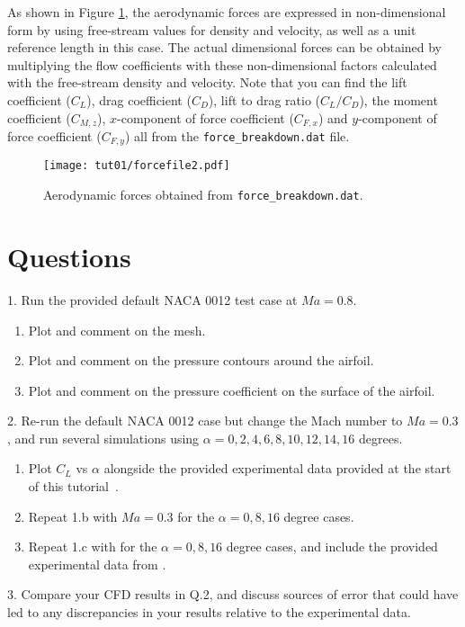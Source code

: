 As shown in Figure \ref{fig1:forcefile2}, the aerodynamic forces are expressed in non-dimensional form by using free-stream values for density and velocity, as well as a unit reference length in this case. The actual dimensional forces can be obtained by multiplying the flow coefficients with these non-dimensional factors calculated with the free-stream density and velocity. Note that you can find the lift coefficient ($C_L$), drag coefficient ($C_D$), lift to drag ratio ($C_L / C_D$), the moment coefficient ($C_{M,z}$), $x$-component of force coefficient ($C_{F,x}$) and $y$-component of force coefficient ($C_{F,y}$) all from the \texttt{force\_breakdown.dat} file.
\begin{figure}[H]
	\centering
	\texttt{[image: tut01/forcefile2.pdf]}
	\caption{Aerodynamic forces obtained from \texttt{force\_breakdown.dat}.}
	\label{fig1:forcefile2}
\end{figure}
\section{Questions}
1. Run the provided default NACA 0012 test case at $Ma=0.8$.
\begin{enumerate}[label=(\alph*)]
    \item Plot and comment on the mesh.
    \item Plot and comment on the pressure contours around the airfoil.
    \item Plot and comment on the pressure coefficient on the surface of the airfoil.
\end{enumerate}
2. Re-run the default NACA 0012 case but change the Mach number to $Ma=0.3$, and run several simulations using $\alpha = 0, 2, 4, 6, 8, 10, 12, 14, 16$ degrees.
\begin{enumerate}[label=(\alph*)]
    \item Plot $C_{L}$ vs $\alpha$ alongside the provided experimental data provided at the start of this tutorial~\cite{ladson1988effects}.
    \item Repeat 1.b with $Ma = 0.3$ for the $\alpha = 0, 8, 16$ degree cases.
    \item Repeat 1.c with for the $\alpha = 0, 8, 16$ degree cases, and include the provided experimental data from \cite{ladson1987pressure}.
\end{enumerate}
3. Compare your CFD results in Q.2, and discuss sources of error that could have led to any discrepancies in your results relative to the experimental data.
